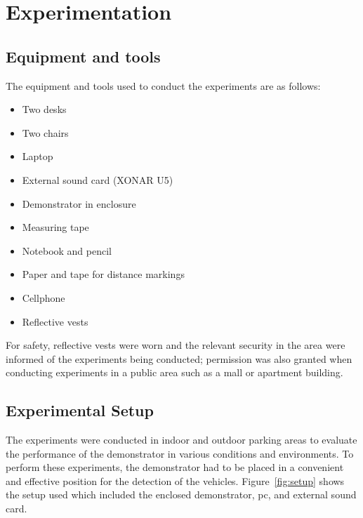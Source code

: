 \documentclass[class=report,11pt,crop=false]{standalone}
\begin{document}
\chapter{Experimentation \label{ch:experimentation}}
\vspace{-1cm}
\section{Equipment and tools}
The equipment and tools used to conduct the experiments are as follows:
\begin{itemize}
    \item Two desks
    \item Two chairs
    \item Laptop
    \item External sound card (XONAR U5)
    \item Demonstrator in enclosure
    \item Measuring tape
    \item Notebook and pencil
    \item Paper and tape for distance markings
    \item Cellphone
    \item Reflective vests
\end{itemize}

For safety, reflective vests were worn and the relevant security in the area were informed of the experiments being conducted; permission was also granted when conducting experiments in a public area such as a mall or apartment building.

\section{Experimental Setup}
The experiments were conducted in indoor and outdoor parking areas to evaluate the performance of the demonstrator in various conditions and environments. To perform these experiments, the demonstrator had to be placed in a convenient and effective position for the detection of the vehicles. Figure~\ref{fig:setup} shows the setup used which included the enclosed demonstrator, \gls{pc}, and external sound card. 
\end{document}
